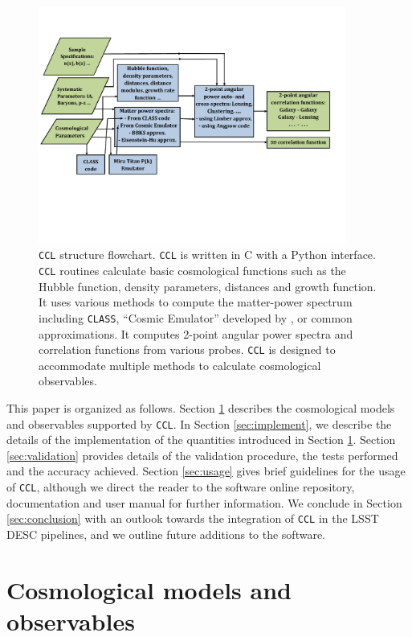 \documentclass[\docopts]{\docclass}
\newcommand{\ccl}{{\tt CCL}\xspace}
\begin{document}
\begin{figure}
\centering
\includegraphics[width=0.9\textwidth]{CCL_Flowchart4}
\caption{\ccl structure flowchart. \ccl is written in C with a Python interface. \ccl routines calculate basic cosmological functions such as the Hubble function, density parameters, distances and growth function. It uses various methods to compute the matter-power spectrum including {\tt CLASS}, ``Cosmic Emulator'' developed by \citet{Lawrence17}, or common approximations. It computes 2-point angular power spectra and correlation functions from various probes. \ccl is designed to accommodate multiple methods to calculate cosmological observables.}
\label{fig:CCL_structure}
\end{figure}

This paper is organized as follows. Section \ref{sec:models} describes the cosmological models and observables supported by \ccl. In Section \ref{sec:implement}, we describe the details of the implementation of the quantities introduced in Section \ref{sec:models}. Section \ref{sec:validation} provides details of the validation procedure, the tests performed and the accuracy achieved. Section \ref{sec:usage} gives brief guidelines for the usage of \ccl, although we direct the reader to the software online repository, documentation and user manual for further information. We conclude in Section \ref{sec:conclusion} with an outlook towards the integration of \ccl in the LSST DESC pipelines, and we outline future additions to the software. 


\section{Cosmological models and observables}
\label{sec:models}
\end{document}
